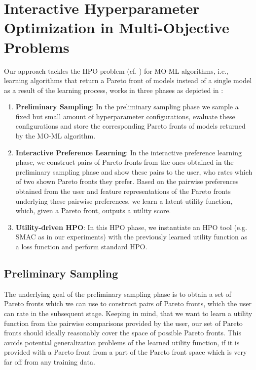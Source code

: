 \section{Interactive Hyperparameter Optimization in Multi-Objective Problems}
\label{moo-sec:method}

Our approach tackles the HPO problem (cf. ) for MO-ML algorithms, i.e., learning algorithms that return a Pareto front of models instead of a single model as a result of the learning process, works in three phases as depicted in : 
\begin{enumerate}
    \item \textbf{Preliminary Sampling}: In the preliminary sampling phase we sample a fixed but small amount of hyperparameter configurations, evaluate these configurations and store the corresponding Pareto fronts of models returned by the MO-ML algorithm. 
    \item \textbf{Interactive Preference Learning}: In the interactive preference learning phase, we construct pairs of Pareto fronts from the ones obtained in the preliminary sampling phase and show these pairs to the user, who rates which of two shown Pareto fronts they prefer. Based on the pairwise preferences obtained from the user and feature representations of the Pareto fronts underlying these pairwise preferences, we learn a latent utility function, which, given a Pareto front, outputs a utility score.
    \item \textbf{Utility-driven HPO}: In this HPO phase, we instantiate an HPO tool (e.g. SMAC \cite{hutter-lion11a,lindauer-jmlr22a} as in our experiments) with the previously learned utility function as a loss function and perform standard HPO.
\end{enumerate}

\subsection{Preliminary Sampling}
\label{moo-ssec:sampling}

The underlying goal of the preliminary sampling phase is to obtain a set of Pareto fronts which we can use to construct pairs of Pareto fronts, which the user can rate in the subsequent stage. Keeping in mind, that we want to learn a utility function from the pairwise comparisons provided by the user, our set of Pareto fronts should ideally reasonably cover the space of possible Pareto fronts. This avoids potential generalization problems of the learned utility function, if it is provided with a Pareto front from a part of the Pareto front space which is very far off from any training data. 

